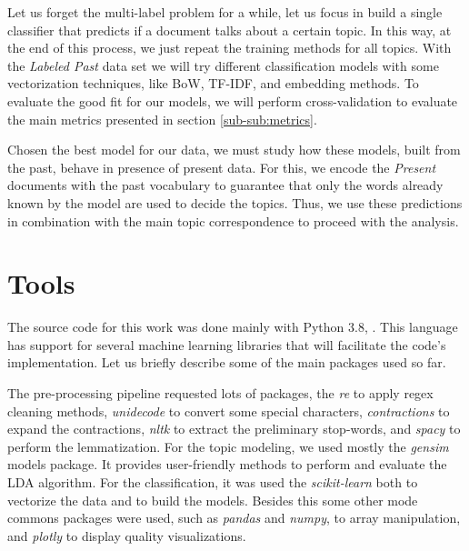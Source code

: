Let us forget the multi-label problem for a while, let us focus in build a single classifier that predicts if a document talks about a certain topic. In this way, at the end of this process, we just repeat the training methods for all topics. With the \textit{Labeled Past} data set we will try different classification models with some vectorization techniques, like BoW, TF-IDF, and embedding methods. To evaluate the good fit for our models, we will perform cross-validation to evaluate the main metrics presented in section \ref{sub-sub:metrics}.

Chosen the best model for our data, we must study how these models, built from the past, behave in presence of present data. For this, we encode the \textit{Present} documents with the past vocabulary to guarantee that only the words already known by the model are used to decide the topics. Thus, we use these predictions in combination with the main topic correspondence to proceed with the analysis.

\section{Tools}

The source code for this work was done mainly with Python 3.8, \cite{python}. This language has support for several machine learning libraries that will facilitate the code's implementation. Let us briefly describe some of the main packages used so far.

The pre-processing pipeline requested lots of packages, the \textit{re} to apply regex cleaning methods, \textit{unidecode} to convert some special characters, \textit{contractions} to expand the contractions, \textit{nltk} to extract the preliminary stop-words, and \textit{spacy} to perform the lemmatization. For the topic modeling, we used mostly the \textit{gensim} models package. It provides user-friendly methods to perform and evaluate the LDA algorithm. For the classification, it was used the \textit{scikit-learn} both to vectorize the data and to build the models. Besides this some other mode commons packages were used, such as \textit{pandas} and \textit{numpy}, to array manipulation, and \textit{plotly} to display quality visualizations.

%
%

